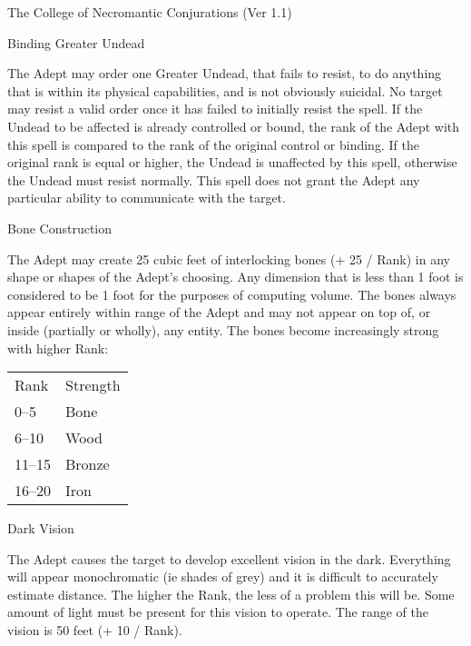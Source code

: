 \begin{Chapter}{The College of Necromantic Conjurations (Ver 1.1)}
\begin{spell}[S-3]{Binding Greater Undead}
\begin{effects}
The Adept may order one Greater Undead, that fails to resist, to do
anything that is within its physical capabilities, and is not
obviously suicidal.  No target may resist a valid order once it has
failed to initially resist the spell.  If the Undead to be affected is
already controlled or bound, the rank of the Adept with this spell is
compared to the rank of the original control or binding. If the
original rank is equal or higher, the Undead is unaffected by this
spell, otherwise the Undead must resist normally.  This spell does not
grant the Adept any particular ability to communicate with the target.
\end{effects}
\end{spell}

\begin{spell}[S-4]{Bone Construction}

\begin{effects}
The Adept may create 25 cubic feet of interlocking bones (+ 25 / Rank)
in any shape or shapes of the Adept’s choosing.  Any dimension that is
less than 1 foot is considered to be 1 foot for the purposes of
computing volume.  The bones always appear entirely within range of
the Adept and may not appear on top of, or inside (partially or
wholly), any entity. The bones become increasingly strong with higher
Rank:

\begin{tabularx}{\columnwidth}{lX}
Rank	& Strength \\
0--5	& Bone \\
6--10	& Wood \\
11--15	& Bronze \\
16--20	& Iron \\
\end{tabularx}
\end{effects}
\end{spell}

\begin{spell}[S-5]{Dark Vision}

\begin{effects}
The Adept causes the target to develop excellent vision in the dark.
Everything will appear monochromatic (ie shades of grey) and it is
difficult to accurately estimate distance. The higher the Rank, the
less of a problem this will be.  Some amount of light must be present
for this vision to operate.  The range of the vision is 50 feet (+ 10
/ Rank).
\end{effects}
\end{spell}


\end{Chapter}
